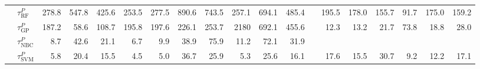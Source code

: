 \documentclass[11pt,a4paper]{article}
\begin{document}
\begin{table}
\begin{tabular}[t]{llrrrrrrrrrrrrrrrrr}
           	& $\tau^{P}_{\text{RF}}$ & 278.8 & 547.8 & 425.6 & 253.5 & 277.5 & 890.6 & 743.5 & 257.1 & 694.1 & 485.4  & & 195.5 & 178.0 & 155.7 & 91.7 & 175.0 & 159.2 \\
            & $\tau^{P}_{\text{GP}}$ & 187.2 & 58.6 & 108.7 & 195.8 & 197.6 & 226.1 & 253.7 & 2180 & 692.1 & 455.6 &  & 12.3 & 13.2 & 21.7 & 73.8 & 18.8 & 28.0\\
            & $\tau^{P}_{\text{NBC}}$  & 8.7 & 42.6 & 21.1 & 6.7 & 9.9 & 38.9 & 75.9 & 11.2 & 72.1 & 31.9 &  &  &  &  &  &  & \\
            & $\tau^{P}_{\text{SVM}}$ & 5.8 & 20.4 & 15.5 & 4.5 & 5.0 & 36.7 & 25.9 & 5.3 & 25.6 & 16.1 &  & 17.6 & 15.5 & 30.7 & 9.2 & 12.2 & 17.1\\
            \bottomrule
\end{tabular}
    \end{table}
    
\end{document}
